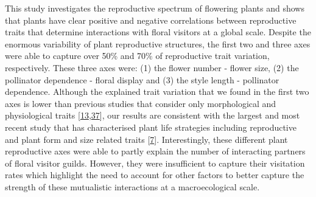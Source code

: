 \documentclass[
  12pt,
  a4paper,
]{article}
\begin{document}
This study investigates the reproductive spectrum of flowering plants and shows that plants have clear positive and negative correlations between reproductive traits that determine interactions with floral visitors at a global scale. Despite the enormous variability of plant reproductive structures, the first two and three axes were able to capture over 50\% and 70\% of reproductive trait variation, respectively. These three axes were: (1) the flower number - flower size, (2) the pollinator dependence - floral display and (3) the style length - pollinator dependence. Although the explained trait variation that we found in the first two axes is lower than previous studies that consider only morphological and physiological traits {[}\protect\hyperlink{ref-diaz2016}{13},\protect\hyperlink{ref-carmona2021}{37}{]}, our results are consistent with the largest and most recent study that has characterised plant life strategies including reproductive and plant form and size related traits {[}\protect\hyperlink{ref-salguero2016}{7}{]}. Interestingly, these different plant reproductive axes were able to partly explain the number of interacting partners of floral visitor guilds. However, they were insufficient to capture their visitation rates which highlight the need to account for other factors to better capture the strength of these mutualistic interactions at a macroecological scale.
\end{document}
